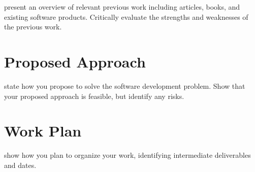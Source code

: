 \documentclass{mprop}
\begin{document}
present an overview of relevant previous work including articles, books, and
existing software products. Critically evaluate the strengths and weaknesses of
the previous work.

\section{Proposed Approach}

state how you propose to solve the software development problem. Show that your
proposed approach is feasible, but identify any risks.

\section{Work Plan}

show how you plan to organize your work, identifying intermediate deliverables
and dates.



\end{document}
